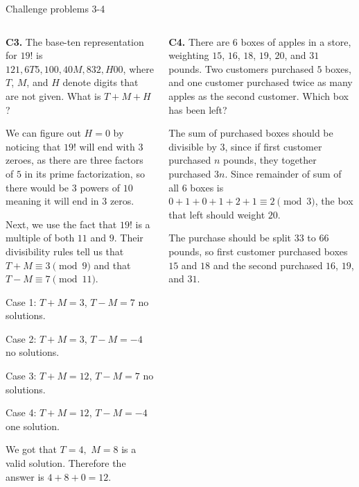 \documentclass[9pt,aspectratio=169]{beamer}
\begin{document}
\begin{frame}{Challenge problems 3-4}
  \begin{columns}[T]
    \begin{column}{0.5\textwidth}
      \begin{problem}
        \textbf{C3.} The base-ten representation for $19!$ is $121{,}6T5{,}100{,}40M{,}832{,}H00$, where $T$, $M$, and $H$ denote digits that are not given. What is $T+M+H$?
      \end{problem}
      We can figure out $H = 0$ by noticing that $19!$ will end with $3$ zeroes, as there are three factors of $5$ in its prime factorization, so there would be $3$ powers of $10$ meaning it will end in $3$ zeros. 
      
      Next, we use the fact that $19!$ is a multiple of both $11$ and $9$. Their divisibility rules tell us that $T + M \equiv 3 \pmod{9}$ and that $T - M \equiv 7 \pmod{11}$. 
      
      Case 1: $T + M = 3$, $T - M = 7$ no solutions.
      
      Case 2: $T + M = 3$, $T - M = -4$ no solutions.

      Case 3: $T + M = 12$, $T - M = 7$ no solutions.

      Case 4: $T + M = 12$, $T - M = -4$ one solution.

      We got that $T = 4,$ $M = 8$ is a valid solution. Therefore the answer is $4 + 8 + 0 = \boxed{12}$.
    \end{column}
    \begin{column}{0.5\textwidth}
      \begin{problem}
        \textbf{C4.} There are $6$ boxes of apples in a store, weighting $15$, $16$, $18$, $19$, $20$, and $31$ pounds. Two customers purchased $5$ boxes, and one customer purchased twice as many apples as the second customer. Which box has been left?
      \end{problem}
      The sum of purchased boxes should be divisible by $3$, since if first customer purchased $n$ pounds, they together purchased $3n$. Since remainder of sum of all $6$ boxes is $0 + 1 + 0 + 1 + 2 + 1 \equiv 2 \pmod{3}$, the box that left should weight $\boxed{20}$.
      
      The purchase should be split $33$ to $66$ pounds, so first customer purchased boxes $15$ and $18$ and the second purchased $16$, $19$, and $31$.
    \end{column}
  \end{columns}
\end{frame}

\end{document}
